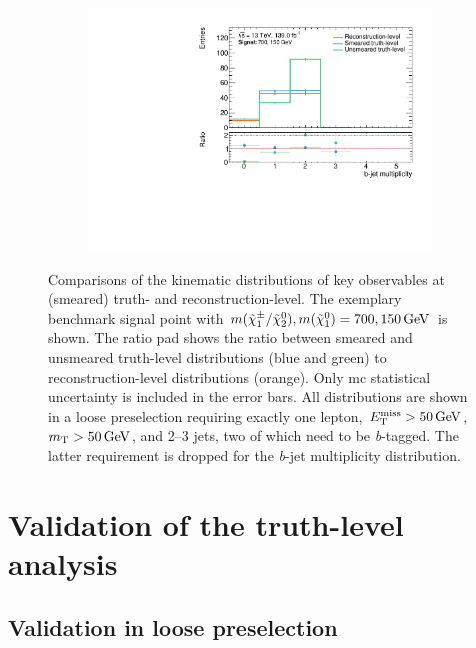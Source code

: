 \begin{figure}
\begin{subfigure}[b]{0.45\linewidth}
	\end{subfigure}\hfill
	\begin{subfigure}[b]{0.45\linewidth}
		\centering\includegraphics[width=\textwidth]{20210324/700_150/nBJet30_C1N2_Wh_hbb_700p0_150p0_smeared.pdf}
	\end{subfigure}\hfill
	\caption{Comparisons of the kinematic distributions of key observables at (smeared) truth- and reconstruction-level. The exemplary benchmark signal point with $m(\charg/\neutr), m(\lsp) = 700, \SI{150}{\GeV}$ is shown. The ratio pad shows the ratio between smeared and unsmeared truth-level distributions (blue and green) to reconstruction-level distributions (orange). Only \gls{mc} statistical uncertainty is included in the error bars. All distributions are shown in a loose preselection requiring exactly one lepton, $\met>\SI{50}{\GeV}$, $\mt > \SI{50}{\GeV}$, and 2--3 jets, two of which need to be \textit{b}-tagged. The latter requirement is dropped for the \textit{b}-jet multiplicity distribution.}
	\label{fig:smearing_preselection}
\end{figure}
 
\section{Validation of the truth-level analysis}

\subsection{Validation in loose preselection}

